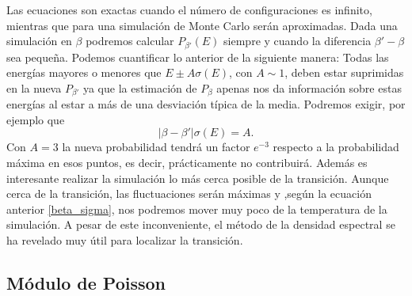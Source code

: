 Las ecuaciones son exactas cuando el número de configuraciones es infinito,
mientras que para una simulación de Monte Carlo serán aproximadas. Dada una
simulación en $\beta$ podremos calcular $P_{\beta'}(E)$ siempre y cuando la
diferencia $\beta'-\beta$ sea pequeña. Podemos cuantificar lo anterior de la
siguiente manera: Todas las energías mayores o menores que $E\pm A \sigma(E)$,
con $A\sim 1$, deben estar suprimidas en la nueva $P_{\beta'}$ ya que la
estimación de $P_{\beta}$ apenas nos da información sobre estas energías al
estar a más de una desviación típica de la media. Podremos exigir, por ejemplo
que  
\begin{equation}\label{beta_sigma}
|\beta-\beta'|\sigma(E)=A.
\end{equation}
Con $A=3$ la nueva probabilidad tendrá un factor $e^{-3}$ respecto a la
probabilidad máxima en esos puntos, es decir, prácticamente no contribuirá.
Además es interesante realizar la simulación lo más cerca posible de la
transición. Aunque cerca de la transición, las fluctuaciones serán máximas y ,según
 la ecuación anterior \eqref{beta_sigma}, nos podremos mover muy poco de la
 temperatura de la simulación. A pesar de este inconveniente, el método de la
 densidad espectral se ha revelado muy útil para localizar la transición.

\subsection{Módulo de Poisson}

